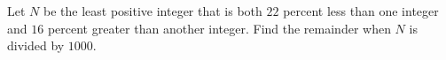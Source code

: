 Let $N$ be the least positive integer that is both $22$ percent less than one integer and $16$ percent greater than another integer. Find the remainder when $N$ is divided by $1000$.